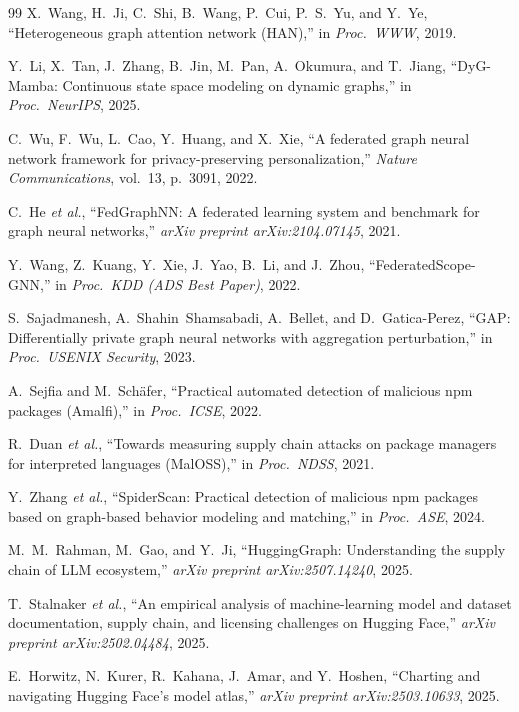 \documentclass[12pt,a4paper]{article}
\theoremstyle{definition}
\theoremstyle{remark}
\begin{document}
\begin{thebibliography}{99}
X.~Wang, H.~Ji, C.~Shi, B.~Wang, P.~Cui, P.~S.~Yu, and Y.~Ye, ``Heterogeneous graph attention network ({HAN}),'' in \emph{Proc.\ WWW}, 2019.

Y.~Li, X.~Tan, J.~Zhang, B.~Jin, M.~Pan, A.~Okumura, and T.~Jiang, ``{DyG-Mamba}: Continuous state space modeling on dynamic graphs,'' in \emph{Proc.\ NeurIPS}, 2025.

C.~Wu, F.~Wu, L.~Cao, Y.~Huang, and X.~Xie, ``A federated graph neural network framework for privacy-preserving personalization,'' \emph{Nature Communications}, vol.~13, p.~3091, 2022.

C.~He \emph{et al.}, ``{FedGraphNN}: A federated learning system and benchmark for graph neural networks,'' \emph{arXiv preprint arXiv:2104.07145}, 2021.

Y.~Wang, Z.~Kuang, Y.~Xie, J.~Yao, B.~Li, and J.~Zhou, ``{FederatedScope-GNN},'' in \emph{Proc.\ KDD (ADS Best Paper)}, 2022.

S.~Sajadmanesh, A.~Shahin~Shamsabadi, A.~Bellet, and D.~Gatica-Perez, ``{GAP}: Differentially private graph neural networks with aggregation perturbation,'' in \emph{Proc.\ USENIX Security}, 2023.

A.~Sejfia and M.~Sch\"afer, ``Practical automated detection of malicious {npm} packages ({Amalfi}),'' in \emph{Proc.\ ICSE}, 2022.

R.~Duan \emph{et al.}, ``Towards measuring supply chain attacks on package managers for interpreted languages ({MalOSS}),'' in \emph{Proc.\ NDSS}, 2021.

Y.~Zhang \emph{et al.}, ``{SpiderScan}: Practical detection of malicious {npm} packages based on graph-based behavior modeling and matching,'' in \emph{Proc.\ ASE}, 2024.

M.~M.~Rahman, M.~Gao, and Y.~Ji, ``{HuggingGraph}: Understanding the supply chain of {LLM} ecosystem,'' \emph{arXiv preprint arXiv:2507.14240}, 2025.

T.~Stalnaker \emph{et al.}, ``An empirical analysis of machine-learning model and dataset documentation, supply chain, and licensing challenges on {Hugging Face},'' \emph{arXiv preprint arXiv:2502.04484}, 2025.

E.~Horwitz, N.~Kurer, R.~Kahana, J.~Amar, and Y.~Hoshen, ``Charting and navigating {Hugging Face}'s model atlas,'' \emph{arXiv preprint arXiv:2503.10633}, 2025.


\end{thebibliography}
\end{document}
